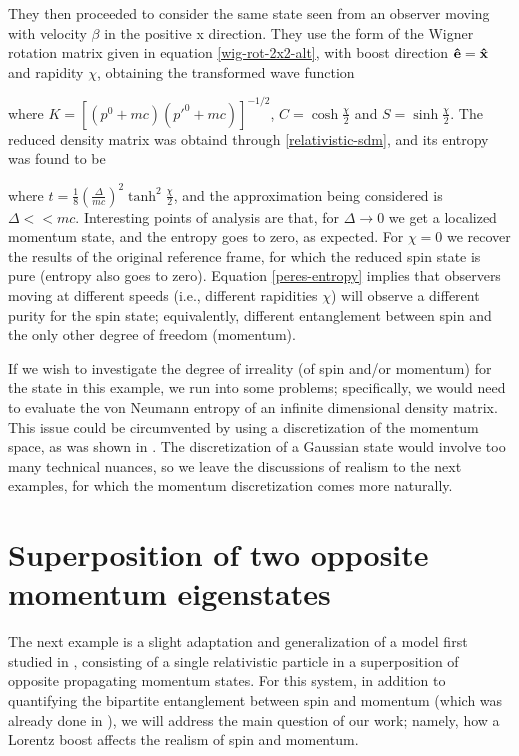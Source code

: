 \documentclass[12pt,a4paper,notitlepage]{report}
\begin{document}
They then proceeded to consider the same state seen from an observer moving with velocity $\beta$ in the positive x direction. They use the form of the Wigner rotation matrix given in equation \eqref{wig-rot-2x2-alt}, with boost direction $\vu{e} = \vu{x}$ and rapidity $\chi$, obtaining the transformed wave function

%
where $K = \left[(p^0 + mc)(p'^0 + mc)\right]^{-1/2}$, $C = \cosh\frac{\chi}{2}$ and $S = \sinh\frac{\chi}{2}$. The reduced density matrix was obtaind through \eqref{relativistic-sdm}, and its entropy was found to be

where $t = \tfrac{1}{8}(\tfrac{\Delta}{mc})^2 \tanh^2\frac{\chi}{2}$, and the approximation being considered is $\Delta <\!\!< mc$. Interesting points of analysis are that, for $\Delta \rightarrow 0$ we get a localized momentum state, and the entropy goes to zero, as expected. For $\chi = 0$ we recover the results of the original reference frame, for which the reduced spin state is pure (entropy also goes to zero). Equation \eqref{peres-entropy} implies that observers moving at different speeds (i.e., different rapidities $\chi$) will observe a different purity for the spin state; equivalently, different entanglement between spin and the only other degree of freedom (momentum). 

If we wish to investigate the degree of irreality (of spin and/or momentum) for the state in this example, we run into some problems; specifically, we would need to evaluate the von Neumann entropy of an infinite dimensional density matrix. This issue could be circumvented by using a discretization of the momentum space, as was shown in \cite{freire_angelo_2019}. The discretization of a Gaussian state would involve too many technical nuances, so we leave the discussions of realism to the next examples, for which the momentum discretization comes more naturally.

\section{Superposition of two opposite momentum eigenstates}
\label{opposite-momenta}

The next example is a slight adaptation and generalization of a model first studied in \cite{dunningham_palge_vedral_2009}, consisting of a single relativistic particle in a superposition of opposite propagating momentum states. For this system, in addition to quantifying the bipartite entanglement between spin and momentum (which was already done in \cite{dunningham_palge_vedral_2009}), we will address the main question of our work; namely, how a Lorentz boost affects the realism of spin and momentum.
\end{document}
